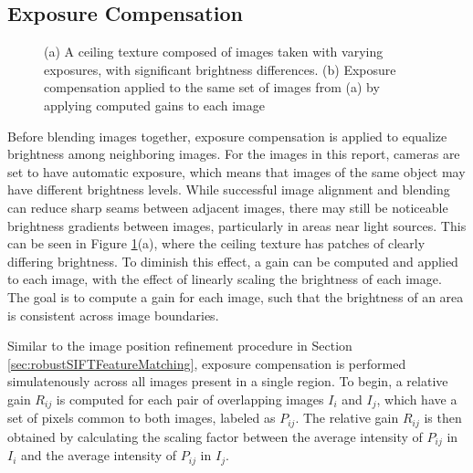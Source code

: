 \documentclass[]{spie}  %
\begin{document}
\subsection{Exposure Compensation}
\label{sec:exposureCompensation}

\begin{figure}
  \centering
  \caption{(a) A ceiling texture composed of images taken with varying
    exposures, with significant brightness differences. (b) Exposure
    compensation applied to the same set of images from (a) by
    applying computed gains to each image}
  \label{fig:exposureDiff}
\end{figure}


Before blending images together, exposure compensation is applied to
equalize brightness among neighboring images. For the images in this
report, cameras are set to have automatic exposure, which means that
images of the same object may have different brightness levels. While
successful image alignment and blending can reduce sharp seams between
adjacent images, there may still be noticeable brightness gradients
between images, particularly in areas near light sources. This can be
seen in Figure \ref{fig:exposureDiff}(a), where the ceiling texture
has patches of clearly differing brightness. To diminish this effect,
a gain can be computed and applied to each image, with the effect of
linearly scaling the brightness of each image. The goal is to compute
a gain for each image, such that the brightness of an area is
consistent across image boundaries.

Similar to the image position refinement procedure in Section
\ref{sec:robustSIFTFeatureMatching}, exposure compensation is
performed simulatenously across all images present in a single
region. To begin, a relative gain $R_{ij}$ is computed for each pair
of overlapping images $I_i$ and $I_j$, which have a set of pixels
common to both images, labeled as $P_{ij}$. The relative gain $R_{ij}$
is then obtained by calculating the scaling factor between the average
intensity of $P_{ij}$ in $I_i$ and the average intensity of $P_{ij}$
in $I_j$.
\end{document}
